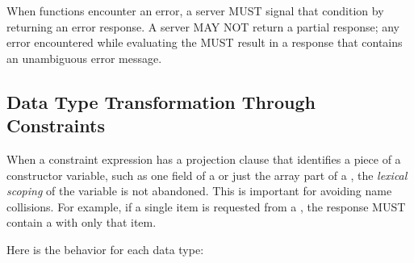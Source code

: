 \documentclass[justify]{nasa-ese}
\renewcommand{\new}[1]{\emph{#1}}
\begin{document}
When functions encounter an error, a \DAP server MUST signal that condition
by returning an error response. A server MAY NOT return a partial response;
any error encountered while evaluating the \CE MUST result in a response that
contains an unambiguous error message.

\subsection{Data Type Transformation Through Constraints}
\label{sec-ce-transform}

When a constraint expression has a projection clause that identifies a piece
of a constructor variable, such as one field of a \Structure or just the
array part of a \Grid, the \new{lexical scoping} of the variable is not
abandoned. This is important for avoiding name collisions. For example, if a
single item is requested from a \Structure, the response MUST contain a
\Structure with only that item.

Here is the behavior for each data type:
\end{document}
